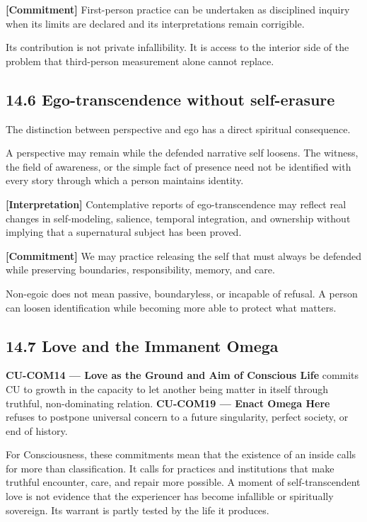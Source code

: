 \documentclass[
  11pt,
]{article}
\begin{document}
\textbf{{[}Commitment{]}} First-person practice can be undertaken as
disciplined inquiry when its limits are declared and its interpretations
remain corrigible.

Its contribution is not private infallibility. It is access to the
interior side of the problem that third-person measurement alone cannot
replace.

\subsection{14.6 Ego-transcendence without
self-erasure}\label{ego-transcendence-without-self-erasure}

The distinction between perspective and ego has a direct spiritual
consequence.

A perspective may remain while the defended narrative self loosens. The
witness, the field of awareness, or the simple fact of presence need not
be identified with every story through which a person maintains
identity.

\textbf{{[}Interpretation{]}} Contemplative reports of ego-transcendence
may reflect real changes in self-modeling, salience, temporal
integration, and ownership without implying that a supernatural subject
has been proved.

\textbf{{[}Commitment{]}} We may practice releasing the self that must
always be defended while preserving boundaries, responsibility, memory,
and care.

Non-egoic does not mean passive, boundaryless, or incapable of refusal.
A person can loosen identification while becoming more able to protect
what matters.

\subsection{14.7 Love and the Immanent
Omega}\label{love-and-the-immanent-omega}

\textbf{CU-COM14 --- Love as the Ground and Aim of Conscious Life}
commits CU to growth in the capacity to let another being matter in
itself through truthful, non-dominating relation. \textbf{CU-COM19 ---
Enact Omega Here} refuses to postpone universal concern to a future
singularity, perfect society, or end of history.

For Consciousness, these commitments mean that the existence of an
inside calls for more than classification. It calls for practices and
institutions that make truthful encounter, care, and repair more
possible. A moment of self-transcendent love is not evidence that the
experiencer has become infallible or spiritually sovereign. Its warrant
is partly tested by the life it produces.
\end{document}
